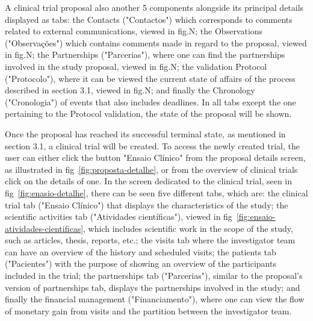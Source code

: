 A clinical trial proposal also another 5 components alongside its principal details displayed as tabs: the Contacts ("Contactos") which corresponds to comments related to external communications, viewed in fig.N; the Observations ("Observações") which contains comments made in regard to the proposal, viewed in fig.N; the Partnerships ("Parcerias"), where one can find the partnerships involved in the study proposal, viewed in fig.N; the validation Protocol ("Protocolo"), where it can be viewed the current state of affairs of the process described in section 3.1, viewed in fig.N; and finally the Chronology ("Cronologia") of events that also includes deadlines. In all tabs except the one pertaining to the Protocol validation, the state of the proposal will be shown.



Once the proposal has reached its successful terminal state, as mentioned in section 3.1, a clinical trial will be created. To access the newly created trial, the user can either click the button "Ensaio Clínico" from the proposal details screen, as illustrated in fig~\ref{fig:proposta-detalhe}, or from the overview of clinical trials click on the details of one.  
In the screen dedicated to the clinical trial, seen in fig~\ref{fig:enasio-detalhe}, there can be seen five different tabs, which are: the clinical trial tab ("Ensaio Clínico") that displays the characteristics of the study; the scientific activities tab ("Atividades científicas"), viewed in fig~\ref{fig:ensaio-atividades-cientificas}, which includes scientific work in the scope of the study, such as articles, thesis, reports, etc.; the visits tab where the investigator team can have an overview of the history and scheduled visits; the patients tab ("Pacientes") with the purpose of showing an overview of the participants included in the trial; the partnerships tab ("Parcerias"), similar to the proposal's version of partnerships tab, displays the partnerships involved in the study; and finally the financial management ("Financiamento"), where one can view the flow of monetary gain from visits and the partition between the investigator team.

